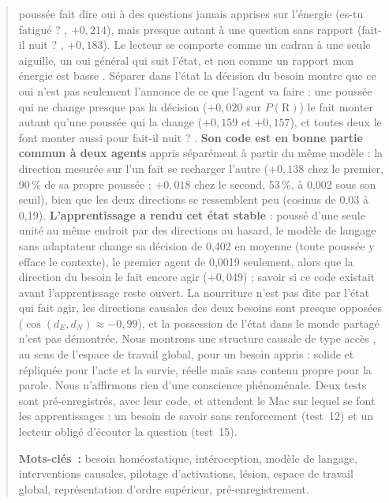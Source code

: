 \documentclass[11pt,a4paper]{article}
\newcommand{\dE}{d_{E}}
\newcommand{\dN}{d_{N}}
\begin{document}
\begin{abstract}
poussée fait dire \og oui \fg{} à des questions jamais apprises sur l'énergie
(\og es-tu fatigué ? \fg{}, $+0,214$), mais presque autant à une question sans rapport
(\og fait-il nuit ? \fg{}, $+0,183$). Le lecteur se comporte comme un cadran à une
seule aiguille, un \og oui \fg{} général qui suit l'état, et non comme un rapport
\og mon énergie est basse \fg{}. Séparer dans l'état la décision du besoin montre que ce
\og oui \fg{} n'est pas seulement l'annonce de ce que l'agent va faire : une poussée qui ne
change presque pas la décision ($+0,020$ sur $P(\mathrm R)$) le fait monter autant qu'une
poussée qui la change ($+0,159$ et $+0,157$), et toutes deux le font monter aussi pour
\og fait-il nuit ? \fg{}. \textbf{Son code est en bonne partie commun à deux agents} appris
séparément à partir du même modèle : la direction mesurée sur l'un fait se recharger l'autre
($+0,138$ chez le premier, 90\,\% de sa propre poussée ; $+0,018$ chez le second, 53\,\%, à
0,002 sous son seuil), bien que les deux directions se ressemblent peu (cosinus de 0,03 à
0,19). \textbf{L'apprentissage a rendu cet état stable} : poussé d'une seule unité au même endroit
par des directions au hasard, le modèle de langage sans adaptateur change sa décision de 0,402
en moyenne (toute poussée y efface le contexte), le premier agent de 0,0019 seulement, alors
que la direction du besoin le fait encore agir ($+0,049$) ; savoir si ce code existait avant
l'apprentissage reste ouvert. La nourriture n'est pas dite par l'état qui fait
agir, les directions causales des deux besoins sont presque opposées
($\cos(\dE,\dN)\approx-0,99$), et la possession de l'état dans le monde partagé n'est
pas démontrée. Nous montrons une structure causale de type \og accès \fg{}, au sens de
l'espace de travail global, pour un besoin appris : solide et répliquée pour l'acte et
la survie, réelle mais sans contenu propre pour la parole. Nous n'affirmons rien d'une
conscience phénoménale. Deux tests sont pré-enregistrés, avec leur code, et attendent le Mac
sur lequel se font les apprentissages : un besoin de savoir sans renforcement (test~12) et un
lecteur obligé d'écouter la question (test~15).

\medskip\noindent
\textbf{Mots-clés~:} besoin homéostatique, intéroception, modèle de langage,
interventions causales, pilotage d'activations, lésion, espace de travail global,
représentation d'ordre supérieur, pré-enregistrement.
\end{abstract}
\clearpage

\setcounter{tocdepth}{1}
{\small\tableofcontents}
\vspace{0.8cm}
\end{document}
